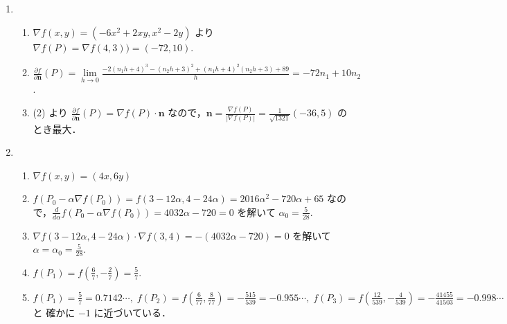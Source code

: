 \documentclass[11pt, uplatex, dvipdfmx, twoside]{jsarticle}
\renewcommand{\dlim}{\lim\limits} %
\begin{document}
\begin{enumerate}[label=\ref{sec:partial}.\arabic*]
  \setlength{\itemsep}{1ex}
  
\item
  \begin{enumerate}[label=(\arabic*)]
    \setlength{\itemsep}{1ex}
    
  \item $\nabla f(x,y) = \left( -6x^2+2xy, x^2-2y\right)$ より
    $\nabla f(P) = \nabla f(4,3))=(-72,10)$.

  \item
    $\frac{\partial f}{\partial \bm{n}}(P)= \dlim_{h \to
      0}\frac{-2(n_1 h + 4)^3 - (n_2 h+3)^2 +
      (n_1h+4)^2(n_2h+3)+89}{h} = -72 n_1 + 10 n_2$.

    
  \item (2) より
    $\frac{\partial f}{\partial \bm{n}}(P) = \nabla f(P) \cdot \bm{n}$
    なので，$\bm{n} = \frac{\nabla f(P)}{ |\nabla f(P)|} =
    \frac{1}{\sqrt{1321}}(-36,5)$ のとき最大．
  \end{enumerate}

\newpage
  
 \item
   \begin{enumerate}[label=(\arabic*)]
     \setlength{\itemsep}{1ex}
     
   \item $\nabla f(x,y) = (4x, 6y)$

   \item
     $f(P_0 - \alpha \nabla f(P_0))=f(3-12\alpha, 4-24\alpha) =
     2016\alpha^2-720\alpha+65$
     なので，$\frac{d}{d\alpha} f(P_0 - \alpha \nabla f(P_0)) =
     4032\alpha-720=0$ を解いて $\alpha_0=\frac{5}{28}$.

   \item
     $\nabla f(3-12\alpha, 4-24\alpha) \cdot \nabla f(3,4) =
     -(4032\alpha-720) =0$ を解いて $\alpha = \alpha_0=\frac{5}{28}$.

   \item $f(P_1) = f\left(\frac{6}{7}, -\frac{2}{7} \right) = \frac{5}{7}$.

   \item
     $ f(P_1) = \frac{5}{7}=0.7142\cdots , \;  f(P_2) = f\left( \frac{6}{77}, \frac{8}{77}\right) =
     -\frac{515}{539}=-0.955\cdots, \; f(P_3) = f\left(\frac{12}{539},
       -\frac{4}{539}\right) = -\frac{41455}{41503} = -0.998\cdots$ と
     確かに $-1$ に近づいている．
   \end{enumerate}


\end{enumerate}
\end{document}
